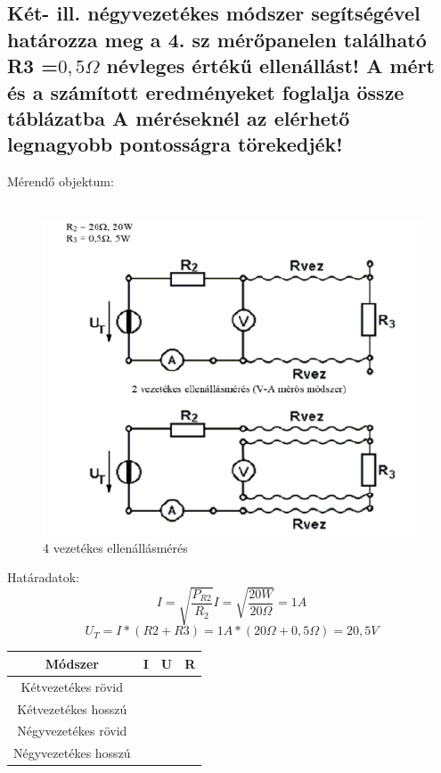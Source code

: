 \documentclass[10pt,a4paper]{article}
\begin{document}
		\subsection{Két- ill. négyvezetékes módszer segítségével határozza meg a 4. sz
mérőpanelen található R3 =$ 0,5\Omega$ névleges értékű ellenállást! A mért és a
számított eredményeket foglalja össze táblázatba A méréseknél az elérhető
legnagyobb pontosságra törekedjék!}
		Mérendő objektum:\\\\
		\begin{figure}[hbtp]
		\centering
		\includegraphics[scale=0.5]{teljes/ket_negy_vez.png}
		\caption{4 vezetékes ellenállásmérés}
		\end{figure}
		
		Határadatok:
		$$I = \sqrt{\frac{P_{R2}}{R_2}} I = \sqrt{\frac{20W}{20\Omega}} = 1 A$$
		$$U_T = I * \left(R2 + R3\right) = 1A * \left(20\Omega + 0,5\Omega\right) = 20,5 V$$\begin{tabular}{|c|c|c|c|}
		\hline 
		Módszer & I & U & R \\ 
		\hline 
		Kétvezetékes rövid &  &  &  \\ 
		\hline 
		Kétvezetékes hosszú &  & &  \\ 
		\hline 
		Négyvezetékes rövid &  &  &  \\ 
		\hline 
		Négyvezetékes hosszú &  &  &  \\ 
		\hline 
		\end{tabular} 
\end{document}
